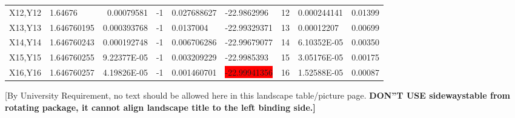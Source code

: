 \begin{landscape}
\begin{table}
\begin{tabular}{|l|l|r|r|l|l|l|l|l|}
    X12,Y12 & 1.64676 & 0.00079581 & -1    & 0.027688627 & -22.9862996 & 12    & 0.000244141 & 0.01399 \\
    X13,Y13 & 1.646760195 & 0.000393768 & -1    & 0.0137004 & -22.99329371 & 13    & 0.00012207 & 0.00699 \\
    X14,Y14 & 1.646760243 & 0.000192748 & -1    & 0.006706286 & -22.99679077 & 14    & 6.10352E-05 & 0.00350 \\
    X15,Y15 & 1.646760255 & 9.22377E-05 & -1    & 0.003209229 & -22.9985393 & 15    & 3.05176E-05 & 0.00175 \\
    X16,Y16 & 1.646760257 & 4.19826E-05 & -1    & 0.001460701 & \colorbox{red}{-22.99941356} & 16    & 1.52588E-05 & 0.00087 \\
    \bottomrule
    \end{tabular}%

{\small [By University Requirement, no text should be allowed here in this landscape table/picture page. \textbf{ DON''T USE sidewaystable from rotating package, it cannot align landscape title to the left binding side.]}}
\end{table}
\end{landscape}

